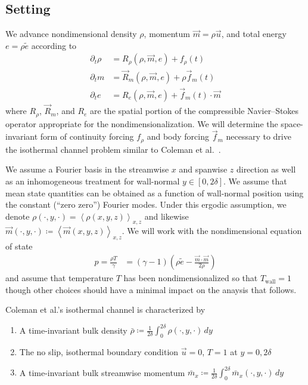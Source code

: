 \documentclass[letterpaper,11pt,nointlimits,reqno]{amsart}
\begin{document}
\subsection*{Setting}

We advance nondimensional density $\rho$, momentum $\vec{m}=\rho{}\vec{u}$, and
total energy $e = \rho{}\tilde{e}$ according to
\begin{subequations}
\begin{align}
  \partial_{t} \rho{} &= R_{\rho}\!\left(\rho,\vec{m},e\right)
                       + f_{\rho}(t)
  \\
  \partial_{t} m      &= \vec{R}_{m}\!\left(\rho,\vec{m},e\right)
                       + \rho \vec{f}_{m}(t)
  \\
  \partial_{t} e      &= R_{e}\!\left(\rho,\vec{m},e\right)
                       + \vec{f}_{m}(t) \cdot \vec{m}
\end{align}
\end{subequations}
where $R_{\rho}$, $\vec{R}_{m}$, and $R_{e}$ are the spatial portion of the
compressible Navier--Stokes operator appropriate for the nondimensionalization.
We will determine the space-invariant form of continuity forcing $f_{\rho}$ and
body forcing $\vec{f}_{m}$ necessary to drive the isothermal channel problem
similar to Coleman et al.~\cite{Coleman1995Numerical}.

We assume a Fourier basis in the streamwise $x$ and spanwise $z$ direction as
well as an inhomogeneous treatment for wall-normal
$y\in\left[0,2\delta\right]$.  We assume that mean state quantities can be
obtained as a function of wall-normal position using the constant (``zero
zero'') Fourier modes.  Under this ergodic assumption, we denote
$\rho\!\left(\cdot,y,\cdot\right) =
\left<\rho\left(x,y,z\right)\right>_{x,z}$ and likewise
$\vec{m}\!\left(\cdot,y,\cdot\right) \coloneqq
\left<\vec{m}\left(x,y,z\right)\right>_{x,z}$.  We will work with the
nondimensional equation of state
\begin{align}
  p  = \frac{\rho{}T}{\gamma}
    &= \left(\gamma-1\right)
       \left( \rho\tilde{e} - \frac{\vec{m}\cdot\vec{m}}{2\rho} \right)
\end{align}
and assume that temperature $T$ has been nondimensionalized so that
$T_\text{wall}=1$ though other choices should have a minimal impact on
the anaysis that follows.

Coleman et al.'s isothermal channel is characterized by
\begin{enumerate}
  \item A time-invariant bulk density $\bar{\rho} \coloneqq \frac{1}{2\delta}
        \int_{0}^{2\delta} \rho\!\left(\cdot,y,\cdot\right)\,dy $
  \item The no slip, isothermal boundary condition
        $\vec{u}=0$, $T = 1$ at $y = 0,2\delta$
  \item A time-invariant bulk streamwise momentum
        $\bar{m}_{x} \coloneqq \frac{1}{2\delta}
        \int_{0}^{2\delta} \bar{m}_{x}\!\left(\cdot,y,\cdot\right)\,dy $
\end{enumerate}
\end{document}
